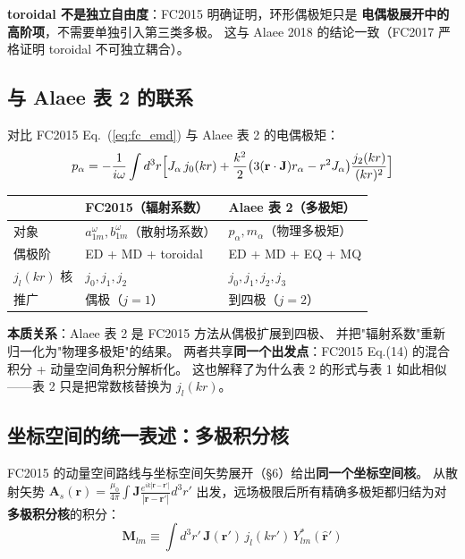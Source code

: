 \begin{nontrivial}
\textbf{toroidal 不是独立自由度}：FC2015 明确证明，环形偶极矩只是
\textbf{电偶极展开中的高阶项}，不需要单独引入第三类多极。
这与 Alaee 2018 的结论一致（FC2017 严格证明 toroidal 不可独立耦合）。
\end{nontrivial}

\subsection{与 Alaee 表 2 的联系}

对比 FC2015 Eq.~(\ref{eq:fc_emd}) 与 Alaee 表 2 的电偶极矩：
\begin{equation}
  p_\alpha = -\frac{1}{i\omega}\int d^3r\Bigl[
    J_\alpha\,j_0(kr) + \frac{k^2}{2}\bigl(3(\mathbf{r}\cdot\mathbf{J})r_\alpha - r^2J_\alpha\bigr)
    \frac{j_2(kr)}{(kr)^2}\Bigr]
  \label{eq:alaee_ed_again}
\end{equation}

\begin{center}
\begin{tabular}{lll}
\toprule
& \textbf{FC2015（辐射系数）} & \textbf{Alaee 表 2（多极矩）} \\
\midrule
对象 & $a^\omega_{1m},b^\omega_{1m}$（散射场系数） & $p_\alpha,m_\alpha$（物理多极矩） \\
偶极阶 & ED + MD + toroidal & ED + MD + EQ + MQ \\
$j_l(kr)$ 核 & $j_0,j_1,j_2$ & $j_0,j_1,j_2,j_3$ \\
推广 & 偶极（$j=1$） & 到四极（$j=2$） \\
\bottomrule
\end{tabular}
\end{center}

\begin{noteworthy}
\textbf{本质关系}：Alaee 表 2 是 FC2015 方法从偶极扩展到四极、
并把"辐射系数"重新归一化为"物理多极矩"的结果。
两者共享\textbf{同一个出发点}：FC2015 Eq.(14) 的混合积分 + 动量空间角积分解析化。
这也解释了为什么表 2 的形式与表 1 如此相似——表 2 只是把常数核替换为 $j_l(kr)$。
\end{noteworthy}

\subsection{坐标空间的统一表述：多极积分核}

FC2015 的动量空间路线与坐标空间矢势展开（\S6）给出\textbf{同一个坐标空间核}。
从散射矢势 $\mathbf{A}_s(\mathbf{r}) = \frac{\mu_0}{4\pi}\int\mathbf{J}\frac{e^{ik|\mathbf{r}-\mathbf{r}'|}}{|\mathbf{r}-\mathbf{r}'|}d^3r'$
出发，远场极限后所有精确多极矩都归结为对\textbf{多极积分核}的积分：
\begin{equation}
  \boxed{\;\mathbf{M}_{lm} \equiv \int d^3r'\,\mathbf{J}(\mathbf{r}')\,j_l(kr')\,Y_{lm}^*(\hat{\mathbf{r}}')\;}
  \label{eq:Mlm2}
\end{equation}

